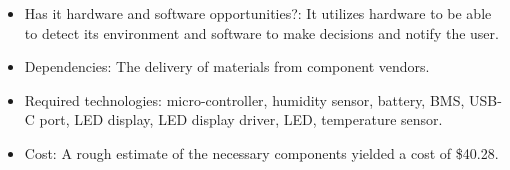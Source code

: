 \begin{enumerate}
\begin{itemize}
          \item Has it hardware and software opportunities?: It utilizes hardware to be able to detect its environment and software to make decisions and notify the user.
          \item Dependencies: The delivery of materials from component vendors.
          \item Required technologies: micro-controller, humidity sensor, battery, BMS, USB-C port, LED display, LED display driver, LED, temperature sensor.
          \item Cost: A rough estimate of the necessary components yielded a cost of \$40.28.
        \end{itemize}
\end{enumerate}
